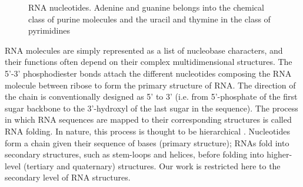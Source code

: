 \begin{figure}
	\begin{minipage}[b]{.5\linewidth}
		\centering
	\end{minipage}%
	\begin{minipage}[b]{.5\linewidth}
		\centering 
	\end{minipage}%
	
	
	\caption{RNA nucleotides. Adenine and guanine belongs into the chemical class of purine molecules and the uracil and thymine in the class of pyrimidines}\label{fig:nucleotide}
\end{figure}
RNA molecules are simply represented as a list of nucleobase characters, and their functions often depend on their complex multidimensional structures. The 5'-3' phosphodiester bonds attach the different nucleotides composing the RNA molecule between ribose to form the primary structure of RNA. The direction of the chain is conventionally designed as 5' to 3' (i.e. from 5'-phosphate of the first sugar backbone to the 3'-hydroxyl of the last sugar in the sequence). The process in which RNA sequences are mapped to their corresponding structures is called RNA folding. In nature, this process is thought to be hierarchical \cite{brion1997hierarchy,tinoco1999rna}. Nucleotides form a chain given their sequence of bases (primary structure); RNAs fold into secondary structures, such as stem-loops and helices, before folding into higher-level (tertiary and quaternary) structures. Our work is restricted here to the secondary level of RNA structures.

